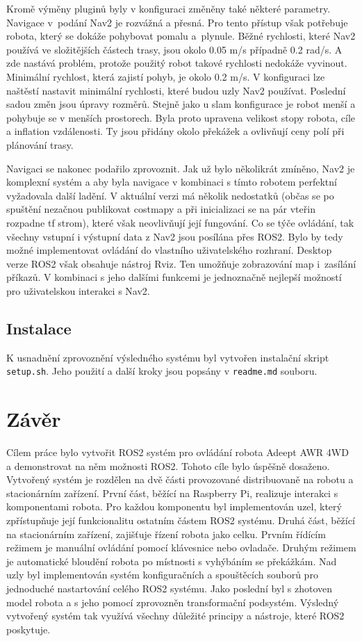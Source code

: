 Kromě výměny pluginů byly v konfiguraci změněny také některé parametry. Navigace v~podání Nav2 je rozvážná a přesná. Pro tento přístup však potřebuje robota, který se dokáže pohybovat pomalu a~plynule. Běžné rychlosti, které Nav2 používá ve složitějších částech trasy, jsou okolo 0.05 m/s případně 0.2 rad/s. A zde nastává problém, protože použitý robot takové rychlosti nedokáže vyvinout. Minimální rychlost, která zajistí pohyb, je okolo 0.2 m/s. V konfiguraci lze naštěstí nastavit minimální rychlosti, které budou uzly Nav2 používat. Poslední sadou změn jsou úpravy rozměrů. Stejně jako u slam konfigurace je robot menší a pohybuje se v menších prostorech. Byla proto upravena velikost stopy robota, cíle a inflation vzdálenosti. Ty jsou přidány okolo překážek a ovlivňují ceny polí při plánování trasy.

Navigaci se nakonec podařilo zprovoznit. Jak už bylo několikrát zmíněno, Nav2 je komplexní systém a aby byla navigace v kombinaci s tímto robotem perfektní vyžadovala další ladění. V aktuální verzi má několik nedostatků (občas se po spuštění nezačnou publikovat costmapy a při inicializaci se na pár vteřin rozpadne tf strom), které však neovlivňují její fungování. Co se týče ovládání, tak všechny vstupní i výstupní data z Nav2 jsou posílána přes ROS2. Bylo by tedy možné implementovat ovládání do vlastního uživatelského rozhraní. Desktop verze ROS2 však obsahuje nástroj Rviz. Ten umožňuje zobrazování map i~zasílání příkazů. V kombinaci s jeho dalšími funkcemi je jednoznačně nejlepší možností pro uživatelskou interakci s Nav2.

\section*{Instalace}
K usnadnění zprovoznění výsledného systému byl vytvořen instalační skript \verb|setup.sh|. Jeho použití a další kroky jsou popsány v \verb|readme.md| souboru.

\chapter{Závěr}
Cílem práce bylo vytvořit ROS2 systém pro ovládání robota Adeept AWR 4WD a demonstrovat na něm možnosti ROS2. Tohoto cíle bylo úspěšně dosaženo. Vytvořený systém je rozdělen na dvě části provozované distribuovaně na robotu a stacionárním zařízení. První část, běžící na Raspberry Pi, realizuje interakci s komponentami robota. Pro každou komponentu byl implementován uzel, který zpřístupňuje její funkcionalitu ostatním částem ROS2 systému. Druhá část, běžící na stacionárním zařízení, zajišťuje řízení robota jako celku. Prvním řídícím režimem je manuální ovládání pomocí klávesnice nebo ovladače. Druhým režimem je automatické bloudění robota po místnosti s vyhýbáním se překážkám. Nad uzly byl implementován systém konfiguračních a spouštěcích souborů pro jednoduché nastartování celého ROS2 systému. Jako poslední byl s zhotoven model robota a s jeho pomocí zprovozněn transformační podsystém. Výsledný vytvořený systém tak využívá všechny důležité principy a nástroje, které ROS2 poskytuje.

